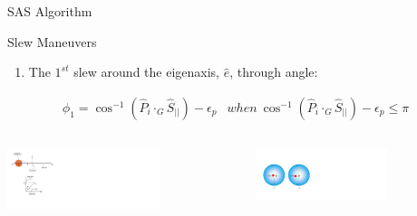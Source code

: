 \documentclass{beamer}
\begin{document}
\begin{frame}{SAS Algorithm}
\begin{block}{Slew Maneuvers}
\begin{enumerate}[I]
\item The $1^{st}$ slew around the eigenaxis, $\hat{e}$, through angle:
\end{enumerate}
\begin{equation}
	\begin{array}{lr}
		\phi_1 = \cos^{-1}(\hat{P}_i\cdot_G\hat{S}_{||})-\epsilon_p & {\scriptstyle when}\  \cos^{-1}(\hat{P}_i\cdot_G\hat{S}_{||})-\epsilon_p\leq \pi
	\end{array}
\end{equation}
\begin{columns}
	\begin{column}{0.5\textwidth}  %
		\begin{center}
			\includegraphics[width=1.75in]{./Figures/SVAS_1rb_modified}
		\end{center}
	\end{column}
	\begin{column}{0.5\textwidth}
		\begin{center}
			\includegraphics[width=1.5in]{./Figures/SASSchematic4}
		\end{center}
	\end{column}
\end{columns}
\end{block}
\end{frame}
\end{document}
